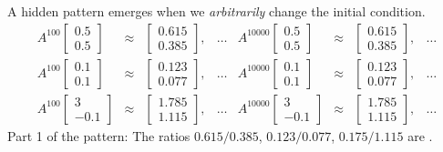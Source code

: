 \documentclass[../main.tex]{subfiles}
\begin{document}
A hidden pattern emerges when we \emph{arbitrarily} change the initial condition.
\[
  \begin{array}{rclcrclc}
    A^{100} \begin{bmatrix} 0.5 \\ 0.5 \end{bmatrix} &\approx& \begin{bmatrix} 0.615 \\ 0.385 \end{bmatrix}, &\dots&
    A^{10000} \begin{bmatrix} 0.5 \\ 0.5 \end{bmatrix} &\approx& \begin{bmatrix} 0.615 \\ 0.385 \end{bmatrix}, &\dots \\[2ex]
    A^{100} \begin{bmatrix} 0.1 \\ 0.1 \end{bmatrix} &\approx& \begin{bmatrix} 0.123 \\ 0.077 \end{bmatrix}, &\dots&
    A^{10000} \begin{bmatrix} 0.1 \\ 0.1 \end{bmatrix} &\approx& \begin{bmatrix} 0.123 \\ 0.077 \end{bmatrix}, &\dots \\[2ex]
    A^{100} \begin{bmatrix} 3 \\ -0.1 \end{bmatrix} &\approx& \begin{bmatrix} 1.785 \\ 1.115 \end{bmatrix}, &\dots&
    A^{10000} \begin{bmatrix} 3 \\ -0.1 \end{bmatrix} &\approx& \begin{bmatrix} 1.785 \\ 1.115 \end{bmatrix}, &\dots
  \end{array}
\]
Part 1 of the pattern: The ratios \(0.615 / 0.385\), \(0.123 / 0.077\), \(0.175 / 1.115\) are \underline{\hspace{2in}}.
\end{document}
